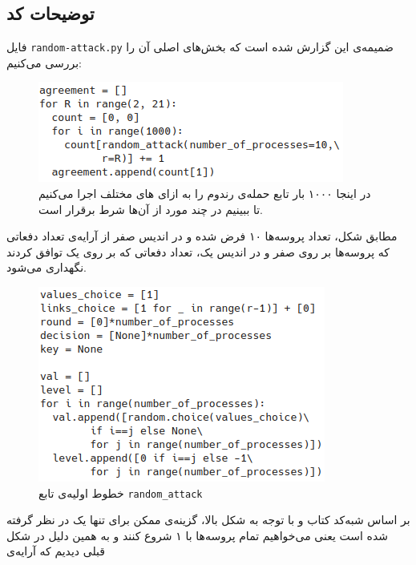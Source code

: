 \documentclass{article}
\begin{document}
\begin{multicols}{2}
\section*{توضیحات کد}
فایل
\texttt{random-attack.py}
ضمیمه‌ی این گزارش شده است که بخش‌های اصلی آن را بررسی می‌کنیم:
\begin{figure}[H]
    \centering
    \includegraphics[width=0.99\linewidth]{Photos/HW4/main.png}
    \caption{
    در اینجا ۱۰۰۰ بار تابع حمله‌ی رندوم را به ازای
    های مختلف اجرا می‌کنیم تا ببینیم در چند مورد از آن‌ها شرط
    برقرار است.
    }
    \label{fig:my_label}
\end{figure}
مطابق شکل، تعداد پروسه‌ها ۱۰ فرض شده و در اندیس صفر از آرایه‌ی
تعداد دفعاتی که پروسه‌ها بر روی صفر و در اندیس یک، تعداد دفعاتی که بر روی یک توافق کردند نگهداری می‌شود.
\begin{figure}[H]
    \centering
    \includegraphics[width=0.95\linewidth]{Photos/HW4/init.png}
    \caption{
    خطوط اولیه‌ی تابع
    \texttt{random\_attack}
    }
    \label{fig:my_label}
\end{figure}
بر اساس شبه‌کد کتاب و با توجه به شکل بالا، گزینه‌ی ممکن برای
تنها یک در نظر گرفته شده است یعنی می‌خواهیم تمام پروسه‌ها با ۱ شروع کنند و به همین دلیل در شکل قبلی دیدیم که آرایه‌ی

\end{multicols}
\end{document}

